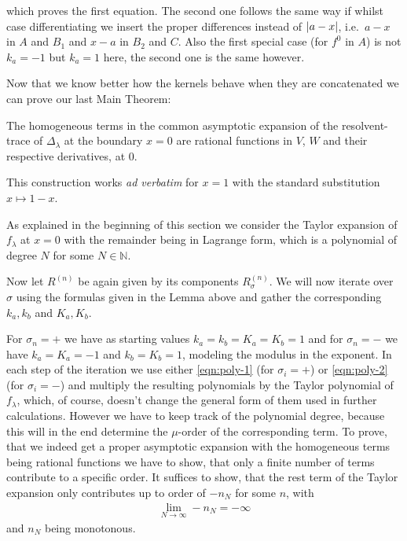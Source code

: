 \begin{Lemma}
\begin{Proof}
    which proves the first equation. The
    second one follows the same way if whilst case differentiating we insert the
    proper differences instead of $\left|a-x\right|$, i.e.\ $a-x$ in $A$ and $B_1$ and
    $x - a$ in $B_2$ and $C$. Also the first special case (for $f^0$ in $A$) is
    not $k_a = -1$ but $k_a = 1$ here, the second one is the same however.
  \end{Proof}
\end{Lemma}

Now that we know better how the kernels behave when they are concatenated we can
prove our last Main Theorem:
\begin{MainTheorem}
  The homogeneous terms in the common asymptotic expansion of the
  resolvent-trace of $\Delta_\lambda$ at the boundary $x = 0$ are rational
  functions in $V$, $W$ and their respective derivatives, at $0$.
  \begin{Remark}
    This construction works \emph{ad verbatim} for $x=1$ with the standard
    substitution $x\mapsto 1 - x$.
  \end{Remark}
  \begin{Remark}
  \end{Remark}
  \begin{Proof}
    As explained in the beginning of this section we consider the Taylor
    expansion of $f_\lambda$ at $x=0$ with the remainder being in Lagrange form,
    which is a polynomial of degree $N$ for some $N\in\mathbb{N}$.

    Now let $R^{(n)}$ be again given by its components $R^{(n)}_{\sigma}$. We
    will now iterate over $\sigma$ using the formulas given in the Lemma above
    and gather the corresponding $k_a,k_b$ and $K_a,K_b$.

    For $\sigma_{n} = +$ we have as starting values $k_a = k_b = K_a = K_b = 1$
    and for $\sigma_{n} = -$ we have $k_a = K_a = -1$ and $k_b = K_b = 1$,
    modeling the modulus in the exponent. In each step of the iteration we use
    either \eqref{eqn:poly-1} (for $\sigma_i = +$) or \eqref{eqn:poly-2} (for
    $\sigma_i = -$) and multiply the resulting polynomials by the
    Taylor polynomial of $f_{\lambda}$, which, of course, doesn't change the
    general form of them used in further calculations. However we have to keep
    track of the polynomial degree, because this will in the end determine the
    $\mu$-order of the corresponding term. To prove, that we indeed get a proper
    asymptotic expansion with the homogeneous terms being rational functions we
    have to show, that only a finite number of terms contribute to a specific
    order. It suffices to show, that the rest term of the Taylor expansion only
    contributes up to order of $-n_N$ for some $n$, with
    \begin{align*}
      \lim_{N\to\infty} -n_N = -\infty
    \end{align*}
    and $n_N$ being monotonous.


\end{Proof}
\end{MainTheorem}
